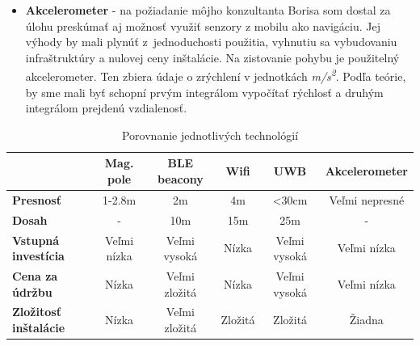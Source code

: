 \documentclass[11pt, oneside]{report}
\begin{document}
\begin{itemize}
\item\textbf{Akcelerometer}  - na požiadanie môjho konzultanta Borisa som dostal za úlohu preskúmať  aj  možnosť využiť   senzory z mobilu ako navigáciu. Jej výhody by mali plynúť z~jednoduchosti použitia, vyhnutiu sa vybudovaniu infraštruktúry  a nulovej ceny inštalácie. Na zistovanie pohybu  je použitelný  akcelerometer. Ten zbiera údaje o zrýchlení v jednotkách \textit{m/s\textsuperscript{2}}. Podľa teórie, by sme mali byť schopní prvým integrálom vypočítať rýchlosť a druhým integrálom prejdenú vzdialenosť.
\end{itemize}

\begin{table}[htb]
\centering
\begin{tabular}{|l|c|c|c|c|c|}
\hline
                              & \textbf{Mag. pole} & \textbf{BLE beacony} & \textbf{Wifi} & \textbf{UWB}  & \textbf{Akcelerometer} \\ \hline
\textbf{Presnosť}             & 1-2.8m                        & 2m                         & 4m            & \textless30cm & Veľmi nepresné            \\ \hline
\textbf{Dosah}                & -                             & 10m                        & 15m           & 25m           & -                         \\ \hline
\textbf{Vstupná investícia}   & Veľmi nízka                   & Veľmi vysoká               & Nízka         & Veľmi vysoká  & Veľmi nízka               \\ \hline
\textbf{Cena za údržbu}       & Nízka                         & Veľmi zložitá              & Nízka         & Veľmi vysoká  & Veľmi nízka               \\ \hline
\textbf{Zložitosť inštalácie} & Nízka                         & Veľmi zložitá              & Zložitá       & Zložitá       & Žiadna                    \\ \hline
\end{tabular}
\caption{Porovnanie  jednotlivých technológií}
\label{tabulatorka}
\end{table}
\end{document}
